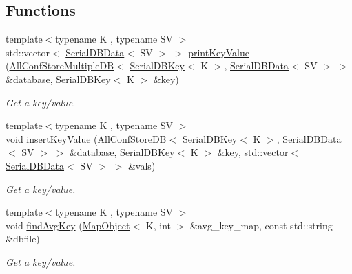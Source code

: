 \subsection*{Functions}
\begin{DoxyCompactItemize}
\item 
{\footnotesize template$<$typename K , typename SV $>$ }\\std\+::vector$<$ \mbox{\hyperlink{classADATIO_1_1SerialDBData}{Serial\+D\+B\+Data}}$<$ SV $>$ $>$ \mbox{\hyperlink{adat-devel_2main_2dbutil_2dbavgsrc_8cc_a33447e6fad2309888af972847134b8bb}{print\+Key\+Value}} (\mbox{\hyperlink{classFILEDB_1_1AllConfStoreMultipleDB}{All\+Conf\+Store\+Multiple\+DB}}$<$ \mbox{\hyperlink{classADATIO_1_1SerialDBKey}{Serial\+D\+B\+Key}}$<$ K $>$, \mbox{\hyperlink{classADATIO_1_1SerialDBData}{Serial\+D\+B\+Data}}$<$ SV $>$ $>$ \&database, \mbox{\hyperlink{classADATIO_1_1SerialDBKey}{Serial\+D\+B\+Key}}$<$ K $>$ \&key)
\begin{DoxyCompactList}\small\item\em Get a key/value. \end{DoxyCompactList}\item 
{\footnotesize template$<$typename K , typename SV $>$ }\\void \mbox{\hyperlink{adat-devel_2main_2dbutil_2dbavgsrc_8cc_a8dcef9d29a9dfc5045f4ee378e94fca3}{insert\+Key\+Value}} (\mbox{\hyperlink{classFILEDB_1_1AllConfStoreDB}{All\+Conf\+Store\+DB}}$<$ \mbox{\hyperlink{classADATIO_1_1SerialDBKey}{Serial\+D\+B\+Key}}$<$ K $>$, \mbox{\hyperlink{classADATIO_1_1SerialDBData}{Serial\+D\+B\+Data}}$<$ SV $>$ $>$ \&database, \mbox{\hyperlink{classADATIO_1_1SerialDBKey}{Serial\+D\+B\+Key}}$<$ K $>$ \&key, std\+::vector$<$ \mbox{\hyperlink{classADATIO_1_1SerialDBData}{Serial\+D\+B\+Data}}$<$ SV $>$ $>$ \&vals)
\begin{DoxyCompactList}\small\item\em Get a key/value. \end{DoxyCompactList}\item 
{\footnotesize template$<$typename K , typename SV $>$ }\\void \mbox{\hyperlink{adat-devel_2main_2dbutil_2dbavgsrc_8cc_a6b84b2344f757e5dab22137c76ba2912}{find\+Avg\+Key}} (\mbox{\hyperlink{classADAT_1_1MapObject}{Map\+Object}}$<$ K, int $>$ \&avg\+\_\+key\+\_\+map, const std\+::string \&dbfile)
\begin{DoxyCompactList}\small\item\em Get a key/value. \end{DoxyCompactList}\item 

\end{DoxyCompactItemize}
